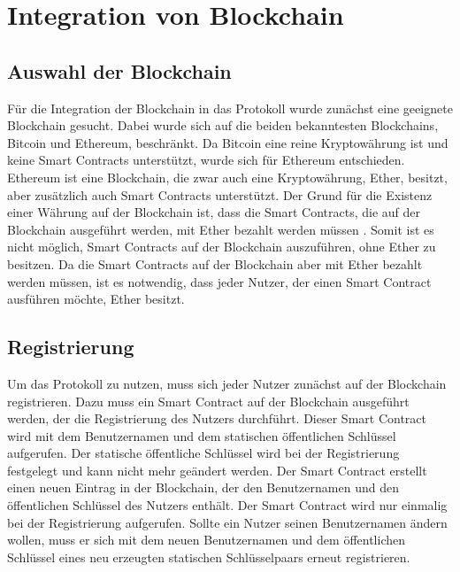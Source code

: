 \section{Integration von Blockchain}
\label{sec:blockchainintegration}


\subsection{Auswahl der Blockchain}
Für die Integration der Blockchain in das Protokoll wurde zunächst eine geeignete Blockchain gesucht. Dabei wurde sich auf die beiden bekanntesten Blockchains, Bitcoin und Ethereum, beschränkt. Da Bitcoin eine reine Kryptowährung ist und keine Smart Contracts unterstützt, wurde sich für Ethereum entschieden. Ethereum ist eine Blockchain, die zwar auch eine Kryptowährung, Ether, besitzt, aber zusätzlich auch Smart Contracts unterstützt. Der Grund für die Existenz einer Währung auf der Blockchain ist, dass die Smart Contracts, die auf der Blockchain ausgeführt werden, mit Ether bezahlt werden müssen \parencite[S. 2]{Antonopoulos_MasteringEthereum}. Somit ist es nicht möglich, Smart Contracts auf der Blockchain auszuführen, ohne Ether zu besitzen. Da die Smart Contracts auf der Blockchain aber mit Ether bezahlt werden müssen, ist es notwendig, dass jeder Nutzer, der einen Smart Contract ausführen möchte, Ether besitzt.


\subsection{Registrierung}
Um das Protokoll zu nutzen, muss sich jeder Nutzer zunächst auf der Blockchain registrieren. Dazu muss ein Smart Contract auf der Blockchain ausgeführt werden, der die Registrierung des Nutzers durchführt. Dieser Smart Contract wird mit dem Benutzernamen und dem statischen öffentlichen Schlüssel aufgerufen. Der statische öffentliche Schlüssel wird bei der Registrierung festgelegt und kann nicht mehr geändert werden. Der Smart Contract erstellt einen neuen Eintrag in der Blockchain, der den Benutzernamen und den öffentlichen Schlüssel des Nutzers enthält. Der Smart Contract wird nur einmalig bei der Registrierung aufgerufen. Sollte ein Nutzer seinen Benutzernamen ändern wollen, muss er sich mit dem neuen Benutzernamen und dem öffentlichen Schlüssel eines neu erzeugten statischen Schlüsselpaars erneut registrieren.

